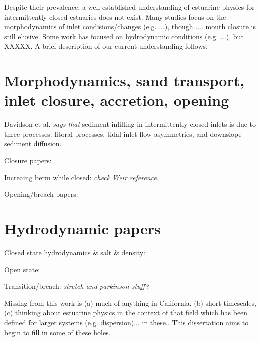 Despite their prevalence, a well established understanding of estuarine physics for intermittently closed estuaries does not exist. Many studies focus on the morphodynamics of inlet condisions/changes (e.g. ...), though .... mouth closure is still elusive. Some work has focused on hydrodynamic conditions (e.g. ...), but XXXXX. A brief description of our current understanding follows.

\section{Morphodynamics, sand transport, inlet closure, accretion, opening}
Davidson et al. \cite{davidson_simple_2009} \emph{says that} sediment infilling in intermittently closed inlets is due to three processes: litoral processes, tidal inlet flow asymmetries, and downslope sediment diffusion.

Closure papers: \cite{ranasinghe_seasonal_2003, elwany_opening_1998, fortunato_morphological_2014, hanes_waves_2011, behrens_characterization_2009, behrens_episodic_2013}.

Increaing berm while closed: \cite{baldock_morphodynamic_2008, laudier_measured_2011, weir_beach_2006} \emph{check Weir reference}. 

Opening/breach papers: \cite{rich_hydrologic_2013, parkinson_breaching_2007, stretch_breaching_2006, elwany_opening_1998, fortunato_morphological_2014}

\section{Hydrodynamic papers}
Closed state hydrodynamics \& salt \& density: \cite{cousins_hydrodynamics_2011, slinger_evolution_1990}

Open state: \cite{largier_dynamics_1991}

Transition/breach: \cite{becker_artificial_2009}  \emph{stretch and parkinson stuff?}

Missing from this work is (a) much of anything in California, (b) short timescales, (c) thinking about estuarine physics in the context of that field which has been defined for larger systems (e.g. dispersion)... in these.. This dissertation aims to begin to fill in some of these holes. 

